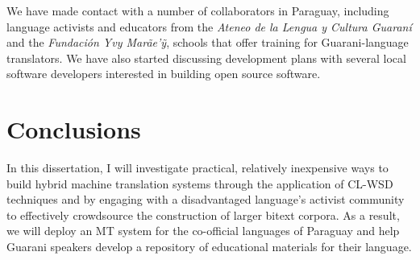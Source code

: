 \documentclass{article}
\begin{document}
We have made contact with a number of collaborators in Paraguay, including
language activists and educators from the \emph{Ateneo de la Lengua y Cultura
Guaraní} and the \emph{Fundación Yvy Marãe'{\~y}}, schools that offer training
for Guarani-language translators. We have also started discussing development
plans with several local software developers interested in building open source
software.

\section{Conclusions}
In this dissertation, I will investigate practical, relatively inexpensive ways
to build hybrid machine translation systems through the application of CL-WSD
techniques and by engaging with a disadvantaged language's activist community
to effectively crowdsource the construction of larger bitext corpora. As a
result, we will deploy an MT system for the co-official languages of Paraguay
and help Guarani speakers develop a repository of educational materials for
their language.


{}
\end{document}
